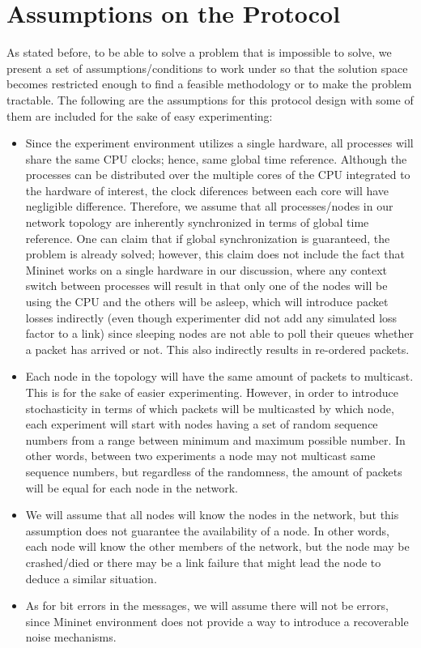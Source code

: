 \documentclass[a4paper, 12pt]{article}
\begin{document}
\section{Assumptions on the Protocol}
As stated before, to be able to solve a problem that is impossible to solve, we present a set of assumptions/conditions to work under so that the solution space becomes restricted enough to find a feasible methodology or to make the problem tractable. The following are the assumptions for this protocol design with some of them are included for the sake of easy experimenting:
\begin{itemize}
    \item Since the experiment environment utilizes a single hardware, all processes will share the same CPU clocks; hence, same global time reference. Although the processes can be distributed over the multiple cores of the CPU integrated to the hardware of interest, the clock diferences between each core will have negligible difference. Therefore, we assume that all processes/nodes in our network topology are inherently synchronized in terms of global time reference. One can claim that if global synchronization is guaranteed, the problem is already solved; however, this claim does not include the fact that Mininet works on a single hardware in our discussion, where any context switch between processes will result in that only one of the nodes will be using the CPU and the others will be asleep, which will introduce packet losses indirectly (even though experimenter did not add any simulated loss factor to a link) since sleeping nodes are not able to poll their queues whether a packet has arrived or not. This also indirectly results in re-ordered packets.
    \item Each node in the topology will have the same amount of packets to multicast. This is for the sake of easier experimenting. However, in order to introduce stochasticity in terms of which packets will be multicasted by which node, each experiment will start with nodes having a set of random sequence numbers from a range between minimum and maximum possible number. In other words, between two experiments a node may not multicast same sequence numbers, but regardless of the randomness, the amount of packets will be equal for each node in the network.
    \item We will assume that all nodes will know the nodes in the network, but this assumption does not guarantee the availability of a node. In other words, each node will know the other members of the network, but the node may be crashed/died or there may be a link failure that might lead the node to deduce a similar situation.
    \item As for bit errors in the messages, we will assume there will not be errors, since Mininet environment does not provide a way to introduce a recoverable noise mechanisms.
\end{itemize}
\end{document}
